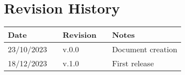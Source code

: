 \chapter*{Revision History}

\begin{table}[h]
    \centering
    \begin{tabular}{l p{2.5cm} l p{2.5cm} l}
        \hline
        \textbf{Date} & & \textbf{Revision} & & \textbf{Notes}          \\ \hline
        23/10/2023    & & v.0.0             & & Document creation       \\
        18/12/2023    & & v.1.0             & & First release           \\ \hline                         
    \end{tabular}
\end{table}

\newpage